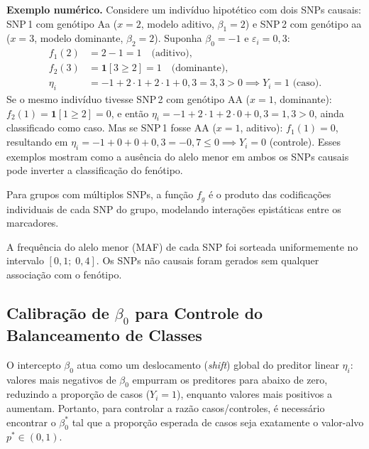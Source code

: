 \documentclass[
    12pt,
    a4paper,
    oneside,
    english,
    french,
    spanish,
    brazil
    ]{abntex2}
\newcommand{\novo}[1]{\textcolor{corNova}{#1}}
\begin{document}
\novo{\textbf{Exemplo numérico.} Considere um indivíduo hipotético com dois SNPs causais: SNP\,1 com genótipo Aa ($x=2$, modelo aditivo, $\beta_1 = 2$) e SNP\,2 com genótipo aa ($x=3$, modelo dominante, $\beta_2 = 2$). Suponha $\beta_0 = -1$ e $\varepsilon_i = 0{,}3$:
\begin{align*}
f_1(2) &= 2 - 1 = 1 \quad \text{(aditivo)}, \\
f_2(3) &= \mathbf{1}[3 \geq 2] = 1 \quad \text{(dominante)}, \\
\eta_i  &= -1 + 2\cdot 1 + 2\cdot 1 + 0{,}3 = 3{,}3 > 0 \implies Y_i = 1 \text{ (caso)}.
\end{align*}
Se o mesmo indivíduo tivesse SNP\,2 com genótipo AA ($x=1$, dominante): $f_2(1) = \mathbf{1}[1 \geq 2] = 0$, e então $\eta_i = -1 + 2\cdot 1 + 2\cdot 0 + 0{,}3 = 1{,}3 > 0$, ainda classificado como caso. Mas se SNP\,1 fosse AA ($x=1$, aditivo): $f_1(1) = 0$, resultando em $\eta_i = -1 + 0 + 0 + 0{,}3 = -0{,}7 \leq 0 \implies Y_i = 0$ (controle). Esses exemplos mostram como a ausência do alelo menor em ambos os SNPs causais pode inverter a classificação do fenótipo.}

\novo{Para grupos com múltiplos SNPs, a função $f_g$ é o produto das codificações individuais de cada SNP do grupo, modelando interações epistáticas entre os marcadores.}

\novo{A frequência do alelo menor (MAF) de cada SNP foi sorteada uniformemente no intervalo $[0{,}1;\; 0{,}4]$. Os SNPs não causais foram gerados sem qualquer associação com o fenótipo.}

\subsection*{Calibração de $\beta_0$ para Controle do Balanceamento de Classes}

\novo{O intercepto $\beta_0$ atua como um deslocamento (\textit{shift}) global do preditor linear $\eta_i$: valores mais negativos de $\beta_0$ empurram os preditores para abaixo de zero, reduzindo a proporção de casos ($Y_i = 1$), enquanto valores mais positivos a aumentam. Portanto, para controlar a razão casos/controles, é necessário encontrar o $\beta_0^*$ tal que a proporção esperada de casos seja exatamente o valor-alvo $p^* \in (0,1)$.}
\end{document}
